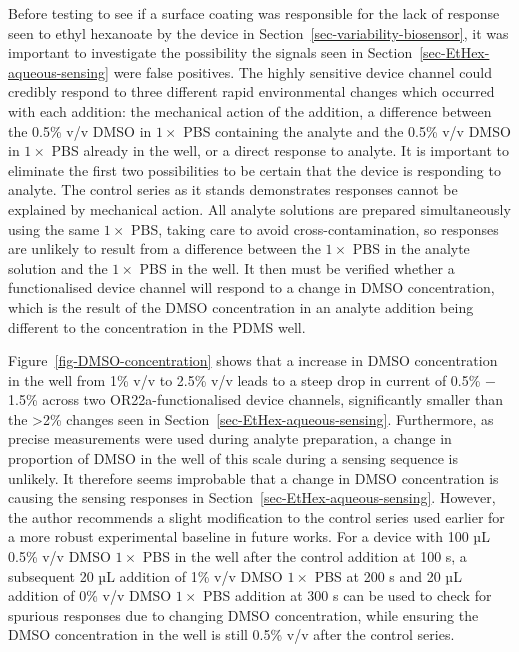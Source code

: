 \documentclass[
  a4paper,
]{scrbook}
\begin{document}
Before testing to see if a surface coating was responsible for the lack
of response seen to ethyl hexanoate by the device in
Section~\ref{sec-variability-biosensor}, it was important to investigate
the possibility the signals seen in
Section~\ref{sec-EtHex-aqueous-sensing} were false positives. The highly
sensitive device channel could credibly respond to three different rapid
environmental changes which occurred with each addition: the mechanical
action of the addition, a difference between the 0.5\% v/v DMSO in
\(1 \times\) PBS containing the analyte and the 0.5\% v/v DMSO in
\(1 \times\) PBS already in the well, or a direct response to analyte.
It is important to eliminate the first two possibilities to be certain
that the device is responding to analyte. The control series as it
stands demonstrates responses cannot be explained by mechanical action.
All analyte solutions are prepared simultaneously using the same
\(1 \times\) PBS, taking care to avoid cross-contamination, so responses
are unlikely to result from a difference between the \(1 \times\) PBS in
the analyte solution and the \(1 \times\) PBS in the well. It then must
be verified whether a functionalised device channel will respond to a
change in DMSO concentration, which is the result of the DMSO
concentration in an analyte addition being different to the
concentration in the PDMS well.

Figure~\ref{fig-DMSO-concentration} shows that a increase in DMSO
concentration in the well from 1\% v/v to 2.5\% v/v leads to a steep
drop in current of 0.5\% \(-\) 1.5\% across two OR22a-functionalised
device channels, significantly smaller than the \textgreater2\% changes
seen in Section~\ref{sec-EtHex-aqueous-sensing}. Furthermore, as precise
measurements were used during analyte preparation, a change in
proportion of DMSO in the well of this scale during a sensing sequence
is unlikely. It therefore seems improbable that a change in DMSO
concentration is causing the sensing responses in
Section~\ref{sec-EtHex-aqueous-sensing}. However, the author recommends
a slight modification to the control series used earlier for a more
robust experimental baseline in future works. For a device with 100 µL
0.5\% v/v DMSO \(1 \times\) PBS in the well after the control addition
at 100 s, a subsequent 20 µL addition of 1\% v/v DMSO \(1 \times\) PBS
at 200 s and 20 µL addition of 0\% v/v DMSO \(1 \times\) PBS addition at
300 s can be used to check for spurious responses due to changing DMSO
concentration, while ensuring the DMSO concentration in the well is
still 0.5\% v/v after the control series.
\end{document}
